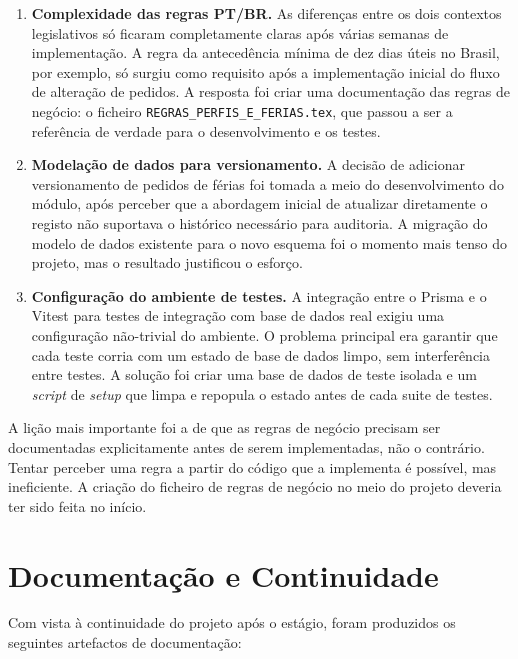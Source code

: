 \documentclass[12pt, a4paper, twoside, openright]{report}
\begin{document}
\begin{enumerate}
  \item \textbf{Complexidade das regras PT/BR.} As diferenças entre os dois contextos
        legislativos só ficaram completamente claras após várias semanas de implementação.
        A regra da antecedência mínima de dez dias úteis no Brasil, por exemplo, só
        surgiu como requisito após a implementação inicial do fluxo de alteração de
        pedidos. A resposta foi criar uma documentação das regras de negócio:
        o ficheiro \texttt{REGRAS\_PERFIS\_E\_FERIAS.tex}, que passou a ser a
        referência de verdade para o desenvolvimento e os testes.

  \item \textbf{Modelação de dados para versionamento.} A decisão de adicionar
        versionamento de pedidos de férias foi tomada a meio do desenvolvimento
        do módulo, após perceber que a abordagem inicial de atualizar diretamente
        o registo não suportava o histórico necessário para auditoria. A migração
        do modelo de dados existente para o novo esquema foi o momento mais tenso
        do projeto, mas o resultado justificou o esforço.

  \item \textbf{Configuração do ambiente de testes.} A integração entre o Prisma
        e o Vitest para testes de integração com base de dados real exigiu uma
        configuração não-trivial do ambiente. O problema principal era garantir
        que cada teste corria com um estado de base de dados limpo, sem interferência
        entre testes. A solução foi criar uma base de dados de teste isolada e um
        \textit{script} de \textit{setup} que limpa e repopula o estado antes de
        cada suite de testes.
\end{enumerate}

A lição mais importante foi a de que as regras de negócio precisam ser documentadas
explicitamente antes de serem implementadas, não o contrário. Tentar perceber uma
regra a partir do código que a implementa é possível, mas ineficiente. A criação
do ficheiro de regras de negócio no meio do projeto deveria ter sido feita no início.

\section{Documentação e Continuidade}

Com vista à continuidade do projeto após o estágio, foram produzidos os seguintes
artefactos de documentação:
\end{document}
